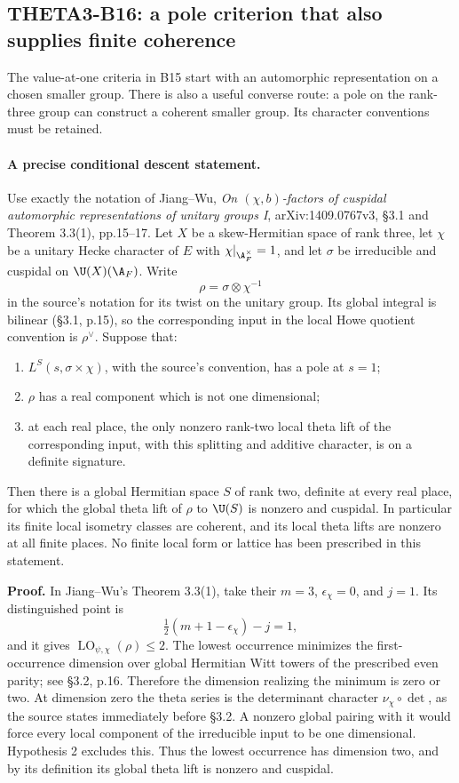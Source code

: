 \subsection{THETA3-B16: a pole criterion that also supplies finite coherence}\label{B16}

The value-at-one criteria in B15 start with an automorphic representation on a chosen smaller group. There is also a useful converse route: a pole on the rank-three group can construct a coherent smaller group. Its character conventions must be retained.

\paragraph{A precise conditional descent statement.}
Use exactly the notation of Jiang--Wu, \emph{On $(\chi,b)$-factors of cuspidal automorphic representations of unitary groups I}, arXiv:1409.0767v3, \S3.1 and Theorem 3.3(1), pp.15--17. Let $X$ be a skew-Hermitian space of rank three, let $\chi$ be a unitary Hecke character of $E$ with $\chi|_{\A_F^\times}=1$, and let $\sigma$ be irreducible and cuspidal on $\U(X)(\A_F)$. Write
\[
 \rho=\sigma\otimes\chi^{-1}
 \tag{B16a}
\]
in the source's notation for its twist on the unitary group. Its global integral is bilinear (\S3.1, p.15), so the corresponding input in the local Howe quotient convention is $\rho^\vee$. Suppose that:
\begin{enumerate}
\item $L^S(s,\sigma\times\chi)$, with the source's convention, has a pole at $s=1$;
\item $\rho$ has a real component which is not one dimensional;
\item at each real place, the only nonzero rank-two local theta lift of the corresponding input, with this splitting and additive character, is on a definite signature.
\end{enumerate}
Then there is a global Hermitian space $S$ of rank two, definite at every real place, for which the global theta lift of $\rho$ to $\U(S)$ is nonzero and cuspidal. In particular its finite local isometry classes are coherent, and its local theta lifts are nonzero at all finite places. No finite local form or lattice has been prescribed in this statement.

\textbf{Proof.}
In Jiang--Wu's Theorem 3.3(1), take their $m=3$, $\epsilon_\chi=0$, and $j=1$. Its distinguished point is
\[
 \tfrac12(m+1-\epsilon_\chi)-j=1,
\]
and it gives $\operatorname{LO}_{\psi,\chi}(\rho)\leq2$. The lowest occurrence minimizes the first-occurrence dimension over global Hermitian Witt towers of the prescribed even parity; see \S3.2, p.16. Therefore the dimension realizing the minimum is zero or two. At dimension zero the theta series is the determinant character $\nu_\chi\circ\det$, as the source states immediately before \S3.2. A nonzero global pairing with it would force every local component of the irreducible input to be one dimensional. Hypothesis 2 excludes this. Thus the lowest occurrence has dimension two, and by its definition its global theta lift is nonzero and cuspidal.

